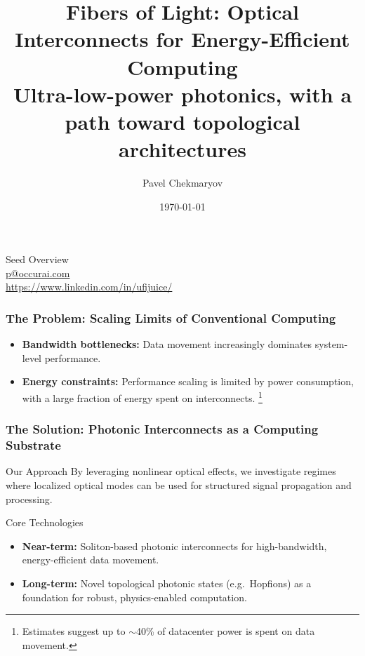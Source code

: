 \documentclass{beamer}
\title[Fibers of Light]{Fibers of Light: Optical Interconnects for Energy-Efficient Computing \\
\normalsize Ultra-low-power photonics, with a path toward topological architectures}
\author{Pavel Chekmaryov}
\date{\today}
\begin{document}
\footnotesize


\begin{frame}
    \titlepage
    \begin{center}
        \vspace{1cm}
    \large Seed Overview \\
    \normalsize \href{mailto:p@occurai.com}{p@occurai.com} \\
    \normalsize \url{https://www.linkedin.com/in/ufijuice/}
    \newline

    \end{center}
\end{frame}

\begin{frame}
    \frametitle{The Problem: Scaling Limits of Conventional Computing}
    \begin{itemize}
        \item \textbf{Bandwidth bottlenecks:} Data movement increasingly dominates system-level performance.
        \item \textbf{Energy constraints:} Performance scaling is limited by power consumption, with a large fraction of energy spent on interconnects.
        \footnote{Estimates suggest up to $\sim$40\% of datacenter power is spent on data movement.}
    \end{itemize}
\end{frame}

\begin{frame}
    \frametitle{The Solution: Photonic Interconnects as a Computing Substrate}

    \begin{block}{Our Approach}
        By leveraging nonlinear optical effects, we investigate regimes where localized optical modes can be used for structured signal propagation and processing.
    \end{block}

    \begin{block}{Core Technologies}
        \begin{itemize}
            \item \textbf{Near-term:} Soliton-based photonic interconnects for high-bandwidth, energy-efficient data movement.
            \item \textbf{Long-term:} Novel topological photonic states (e.g.\ Hopfions) as a foundation for robust, physics-enabled computation.
        \end{itemize}
    \end{block}
\end{frame}
\end{document}
